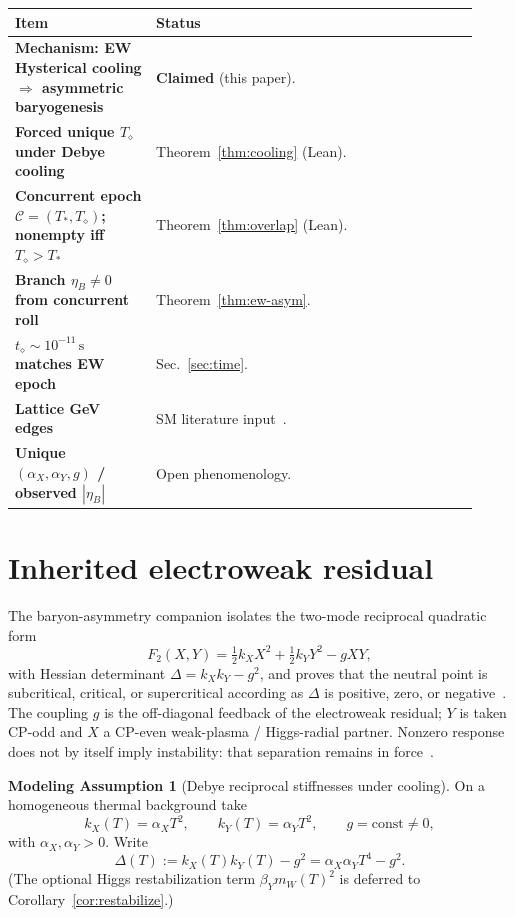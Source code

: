 \documentclass[11pt]{article}
\theoremstyle{definition}
\newtheorem{model}[theorem]{Modeling Assumption}
\theoremstyle{remark}
\newcommand{\Td}{T_{\diamond}}
\begin{document}
\begin{center}
\small
\begin{tabular}{@{}>{\bfseries}p{0.28\linewidth}p{0.64\linewidth}@{}}
\toprule
Item & Status\\
\midrule
Mechanism: EW Hysterical cooling $\Rightarrow$ asymmetric baryogenesis & \textbf{Claimed} (this paper).\\
Forced unique $\Td$ under Debye cooling & Theorem~\ref{thm:cooling} (Lean).\\
Concurrent epoch $\mathcal C=(T_*,\Td)$; nonempty iff $\Td>T_*$ & Theorem~\ref{thm:overlap} (Lean).\\
Branch $\eta_B\neq0$ from concurrent roll & Theorem~\ref{thm:ew-asym}.\\
$t_\diamond\sim10^{-11}\,\mathrm{s}$ matches EW epoch & Sec.~\ref{sec:time}.\\
Lattice GeV edges & SM literature input~\cite{DOnofrio2014}.\\
Unique $(\alpha_X,\alpha_Y,g)$ / observed $|\eta_B|$ & Open phenomenology.\\
\bottomrule
\end{tabular}
\end{center}

\section{Inherited electroweak residual}
\label{sec:inherited}
The baryon-asymmetry companion isolates the two-mode reciprocal quadratic form
\begin{equation}
\label{eq:F2}
F_2(X,Y)=\tfrac12 k_X X^2+\tfrac12 k_Y Y^2-gXY,
\end{equation}
with Hessian determinant $\Delta=k_Xk_Y-g^2$, and proves that the neutral point is
subcritical, critical, or supercritical according as $\Delta$ is positive, zero,
or negative~\cite{boyd2026branch}.
The coupling $g$ is the off-diagonal feedback of the electroweak residual; $Y$ is
taken CP-odd and $X$ a CP-even weak-plasma / Higgs-radial partner.
Nonzero response does not by itself imply instability: that separation remains in
force~\cite{boyd2026branch}.

\begin{model}[Debye reciprocal stiffnesses under cooling]
\label{model:debye}
On a homogeneous thermal background take
\begin{equation}
\label{eq:stiff}
\boxed{
k_X(T)=\alpha_X T^2,
\qquad
k_Y(T)=\alpha_Y T^2,
\qquad
g=\mathrm{const}\neq0,
}
\end{equation}
with $\alpha_X,\alpha_Y>0$.
Write
\begin{equation}
\label{eq:Delta}
\Delta(T):=k_X(T)k_Y(T)-g^2=\alpha_X\alpha_Y T^4-g^2.
\end{equation}
(The optional Higgs restabilization term $\beta_Y m_W(T)^2$
is deferred to Corollary~\ref{cor:restabilize}.)
\end{model}
\end{document}
